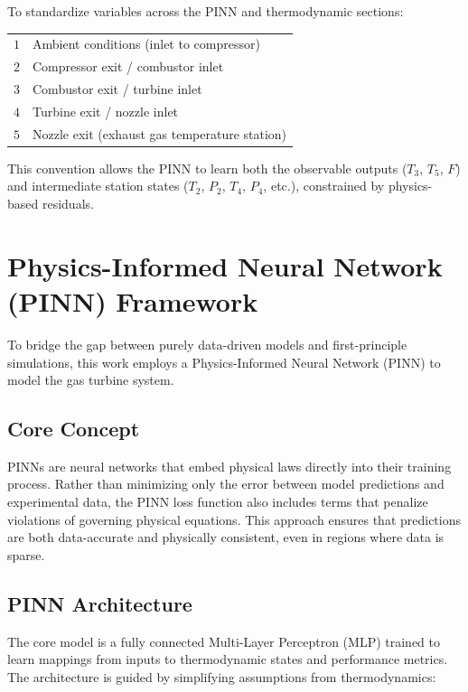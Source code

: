 \documentclass[
  12pt,
  oneside,
  a4paper,
  english,
  brazil]{abntex2}
\begin{document}
To standardize variables across the PINN and thermodynamic sections:

\begin{center}
\begin{tabular}{ll}
$1$ & Ambient conditions (inlet to compressor) \\
$2$ & Compressor exit / combustor inlet \\
$3$ & Combustor exit / turbine inlet \\
$4$ & Turbine exit / nozzle inlet \\
$5$ & Nozzle exit (exhaust gas temperature station)
\end{tabular}
\end{center}

This convention allows the PINN to learn both the observable outputs
(\(T_3\), \(T_5\), \(F\)) and intermediate station states (\(T_2\),
\(P_2\), \(T_4\), \(P_4\), etc.), constrained by physics-based
residuals.

\section{\texorpdfstring{\textbf{Physics-Informed Neural Network (PINN)
Framework}}{Physics-Informed Neural Network (PINN) Framework}}\label{physics-informed-neural-network-pinn-framework}

To bridge the gap between purely data-driven models and first-principle
simulations, this work employs a Physics-Informed Neural Network (PINN)
to model the gas turbine system.

\subsection{Core Concept}\label{core-concept}

PINNs are neural networks that embed physical laws directly into their
training process. Rather than minimizing only the error between model
predictions and experimental data, the PINN loss function also includes
terms that penalize violations of governing physical equations. This
approach ensures that predictions are both data-accurate and physically
consistent, even in regions where data is sparse.

\subsection{PINN Architecture}\label{pinn-architecture}

The core model is a fully connected Multi-Layer Perceptron (MLP) trained
to learn mappings from inputs to thermodynamic states and performance
metrics. The architecture is guided by simplifying assumptions from
thermodynamics:
\end{document}
